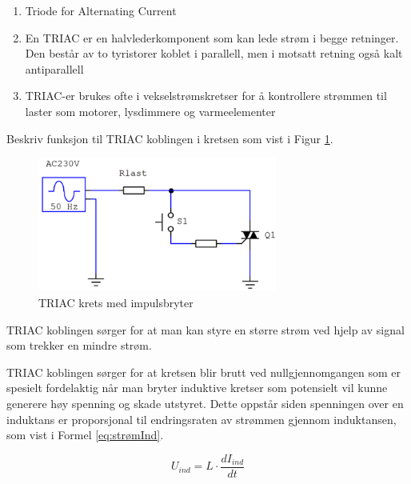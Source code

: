 \begin{solution}[name=Løsningsforslag]


	\begin{enumerate}[label=\roman*)]
	\item Triode for Alternating Current
	\item En TRIAC er en halvlederkomponent som kan lede strøm i begge retninger. Den består av to tyristorer koblet i parallell, men i motsatt retning også kalt antiparallell
	\item TRIAC-er brukes ofte i vekselstrømskretser for å kontrollere strømmen til laster som motorer, lysdimmere og varmeelementer
	
\end{enumerate}




\end{solution}




\begin{question}[name=Spørsmål, topic=tyristor]
Beskriv funksjon til TRIAC koblingen i kretsen som vist i Figur \ref{fig:triPush}.
\begin{figure}[H]
	\centering
	\includegraphics[width=0.7\textwidth]{tyristor/figurer/tricBasic.png}
	\caption{TRIAC krets med impulsbryter}
	\label{fig:triPush}
\end{figure}
\end{question}

\vspace{0.5cm} %

\begin{solution}[name=Løsningsforslag]
TRIAC koblingen sørger for at man kan styre en større strøm ved hjelp av signal som trekker en mindre strøm.

TRIAC koblingen sørger for at kretsen blir brutt ved nullgjennomgangen som er spesielt fordelaktig når man bryter induktive kretser som potensielt vil kunne generere høy spenning og skade utstyret. Dette oppstår siden spenningen over en induktans er proporsjonal til endringsraten av strømmen gjennom induktansen, som vist i Formel \ref{eq:strømInd}.

\begin{equation}
	\label{eq:strømInd}
	U_{ind}=L \cdot \frac{dI_{ind}}{dt}
\end{equation}

\end{solution}


